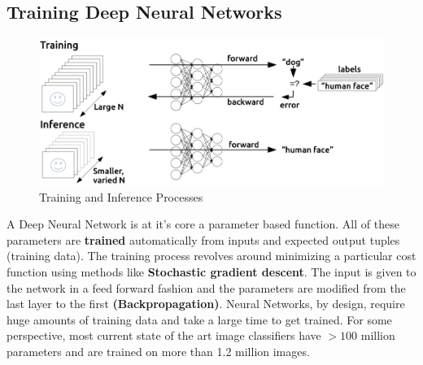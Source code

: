 \documentclass[11pt]{article}
\begin{document}
		
			\subsection{Training Deep Neural Networks}
					\begin{figure}[ht!]
					\includegraphics[width=14cm]{training_inference1.png}
					\caption{Training and Inference Processes\label{fig5}}
				\end{figure}
				A Deep Neural Network is at it's core a parameter based function. All of these parameters are  \textbf{trained} automatically from inputs and expected output tuples (training data). The training process revolves around minimizing a particular cost function using methods like \textbf{Stochastic gradient descent}. The input is given to the network in a feed forward fashion and the parameters are modified from the last layer to the first \textbf{(Backpropagation)}. Neural Networks, by design, require huge amounts of training data and take a large time to get trained. For some perspective, most current state of the art image classifiers have $> 100$ million parameters and are trained on more than 1.2 million images. 





	\begin{thebibliography}{1}
	


	\end{thebibliography}
\end{document}
